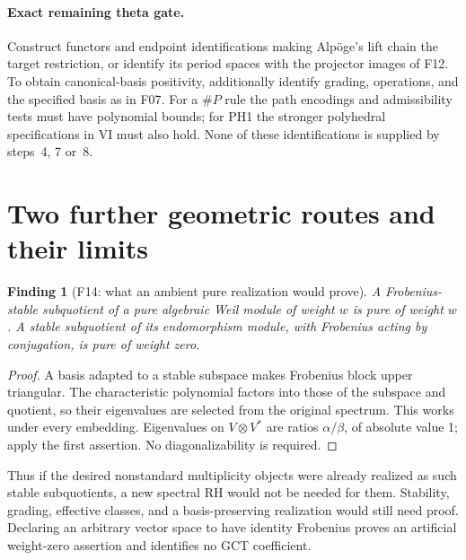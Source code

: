 \documentclass[11pt,a4paper]{article}
\newcommand{\fid}[1]{\textsf{#1}}\newcommand{\gate}[1]{\textsf{#1}}
\theoremstyle{named}\newtheorem{finding}{Finding}[section]
\theoremstyle{definition}\newtheorem{definition}[finding]{Definition}
\theoremstyle{remark}\newtheorem{remark}[finding]{Remark}
\begin{document}
\paragraph{Exact remaining theta gate.}
Construct functors and endpoint identifications making Alp\"oge's lift chain the target restriction, or identify its period spaces with the projector images of \fid{F12}. To obtain canonical-basis positivity, additionally identify grading, operations, and the specified basis as in \fid{F07}. For a \(\#P\) rule the path encodings and admissibility tests must have polynomial bounds; for PH1 the stronger polyhedral specifications in VI must also hold. None of these identifications is supplied by steps~4, 7 or~8.

\section{Two further geometric routes and their limits}\label{sec:other}
\begin{finding}[\fid{F14}: what an ambient pure realization would prove]\label{f:sub}
A Frobenius-stable subquotient of a pure algebraic Weil module of weight $w$ is pure of weight $w$. A stable subquotient of its endomorphism module, with Frobenius acting by conjugation, is pure of weight zero.
\end{finding}
\begin{proof}
A basis adapted to a stable subspace makes Frobenius block upper triangular. The characteristic polynomial factors into those of the subspace and quotient, so their eigenvalues are selected from the original spectrum. This works under every embedding. Eigenvalues on $V\otimes V^*$ are ratios $\alpha/\beta$, of absolute value 1; apply the first assertion. No diagonalizability is required.
\end{proof}
Thus if the desired nonstandard multiplicity objects were already realized as such stable subquotients, a new spectral RH would not be needed for them. Stability, grading, effective classes, and a basis-preserving realization would still need proof. Declaring an arbitrary vector space to have identity Frobenius proves an artificial weight-zero assertion and identifies no GCT coefficient.
\end{document}

